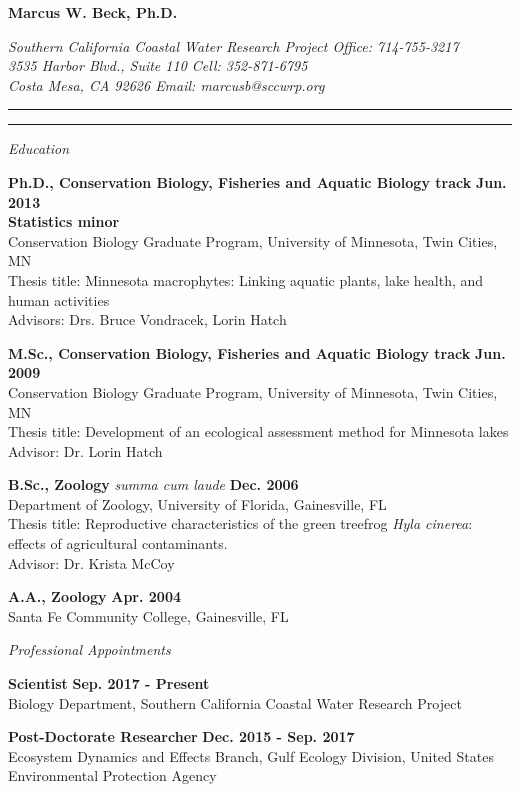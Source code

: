 \documentclass[letterpaper,12pt]{article}
\newcommand{\sectitle}[1]{\vspace{\baselineskip} \centerline{\large{\textit{#1}}}}
\begin{document}
\raggedright

\LARGE
\centerline{{\bf Marcus W. Beck, Ph.D.}}
\normalsize
\textit{Southern California Coastal Water Research Project \hfill Office: 714-755-3217 \\
3535 Harbor Blvd., Suite 110 \hfill Cell: 352-871-6795 \\
Costa Mesa, CA 92626 \hfill Email: marcusb@sccwrp.org}
\vspace{4pt}
\hrule
\vspace{2pt}
\hrule
\vspace{4pt}

\sectitle{Education}

{\bf Ph.D., Conservation Biology, Fisheries and Aquatic Biology track} \hfill {\bf Jun. 2013} \\
{\bf Statistics minor} \\
Conservation Biology Graduate Program, University of Minnesota, Twin Cities, MN \\
Thesis title: Minnesota macrophytes: Linking aquatic plants, lake health, and human activities \\
Advisors: Drs. Bruce Vondracek, Lorin Hatch

{\bf M.Sc., Conservation Biology, Fisheries and Aquatic Biology track} \hfill {\bf Jun. 2009} \\
Conservation Biology Graduate Program, University of Minnesota, Twin Cities, MN \\
Thesis title: Development of an ecological assessment method for Minnesota lakes\\
Advisor: Dr. Lorin Hatch

{\bf B.Sc., Zoology} \textit{summa cum laude} \hfill {\bf Dec. 2006} \\
Department of Zoology, University of Florida, Gainesville, FL \\
Thesis title: Reproductive characteristics of the green treefrog \textit{Hyla cinerea}: effects of agricultural contaminants. \\
Advisor: Dr. Krista McCoy

{\bf A.A., Zoology} \hfill {\bf Apr. 2004} \\
Santa Fe Community College, Gainesville, FL

\sectitle{Professional Appointments}

{\bf Scientist} \hfill {\bf Sep. 2017 - Present}\\
Biology Department, Southern California Coastal Water Research Project

{\bf Post-Doctorate Researcher} \hfill {\bf Dec. 2015 - Sep. 2017}\\
Ecosystem Dynamics and Effects Branch, Gulf Ecology Division, United States Environmental Protection Agency
\end{document}
